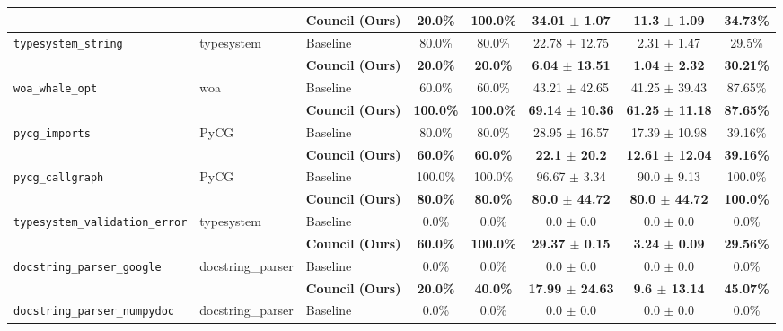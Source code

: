\begin{table}[t]
\begin{tabular}{lll c c c c c}
 & & \textbf{Council (Ours)} & \textbf{20.0\%} & \textbf{100.0\%} & \textbf{34.01 $\pm$ 1.07} & \textbf{11.3 $\pm$ 1.09} & \textbf{34.73\%} \\
\midrule
\multirow{2}{*}{\texttt{typesystem\_string}} & \multirow{2}{*}{typesystem} & Baseline & 80.0\% & 80.0\% & 22.78 $\pm$ 12.75 & 2.31 $\pm$ 1.47 & 29.5\% \\
 & & \textbf{Council (Ours)} & \textbf{20.0\%} & \textbf{20.0\%} & \textbf{6.04 $\pm$ 13.51} & \textbf{1.04 $\pm$ 2.32} & \textbf{30.21\%} \\
\midrule
\multirow{2}{*}{\texttt{woa\_whale\_opt}} & \multirow{2}{*}{woa} & Baseline & 60.0\% & 60.0\% & 43.21 $\pm$ 42.65 & 41.25 $\pm$ 39.43 & 87.65\% \\
 & & \textbf{Council (Ours)} & \textbf{100.0\%} & \textbf{100.0\%} & \textbf{69.14 $\pm$ 10.36} & \textbf{61.25 $\pm$ 11.18} & \textbf{87.65\%} \\
\midrule
\multirow{2}{*}{\texttt{pycg\_imports}} & \multirow{2}{*}{PyCG} & Baseline & 80.0\% & 80.0\% & 28.95 $\pm$ 16.57 & 17.39 $\pm$ 10.98 & 39.16\% \\
 & & \textbf{Council (Ours)} & \textbf{60.0\%} & \textbf{60.0\%} & \textbf{22.1 $\pm$ 20.2} & \textbf{12.61 $\pm$ 12.04} & \textbf{39.16\%} \\
\midrule
\multirow{2}{*}{\texttt{pycg\_callgraph}} & \multirow{2}{*}{PyCG} & Baseline & 100.0\% & 100.0\% & 96.67 $\pm$ 3.34 & 90.0 $\pm$ 9.13 & 100.0\% \\
 & & \textbf{Council (Ours)} & \textbf{80.0\%} & \textbf{80.0\%} & \textbf{80.0 $\pm$ 44.72} & \textbf{80.0 $\pm$ 44.72} & \textbf{100.0\%} \\
\midrule
\multirow{2}{*}{\texttt{typesystem\_validation\_error}} & \multirow{2}{*}{typesystem} & Baseline & 0.0\% & 0.0\% & 0.0 $\pm$ 0.0 & 0.0 $\pm$ 0.0 & 0.0\% \\
 & & \textbf{Council (Ours)} & \textbf{60.0\%} & \textbf{100.0\%} & \textbf{29.37 $\pm$ 0.15} & \textbf{3.24 $\pm$ 0.09} & \textbf{29.56\%} \\
\midrule
\multirow{2}{*}{\texttt{docstring\_parser\_google}} & \multirow{2}{*}{docstring\_parser} & Baseline & 0.0\% & 0.0\% & 0.0 $\pm$ 0.0 & 0.0 $\pm$ 0.0 & 0.0\% \\
 & & \textbf{Council (Ours)} & \textbf{20.0\%} & \textbf{40.0\%} & \textbf{17.99 $\pm$ 24.63} & \textbf{9.6 $\pm$ 13.14} & \textbf{45.07\%} \\
\midrule
\multirow{2}{*}{\texttt{docstring\_parser\_numpydoc}} & \multirow{2}{*}{docstring\_parser} & Baseline & 0.0\% & 0.0\% & 0.0 $\pm$ 0.0 & 0.0 $\pm$ 0.0 & 0.0\% \\

\end{tabular}
\end{table}
